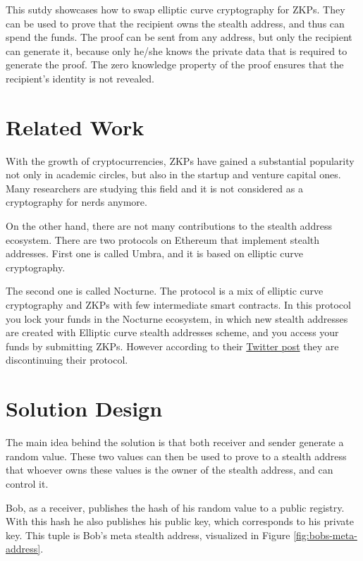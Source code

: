 \documentclass[conference,comsoc,10pt]{IEEEtran}
\begin{document}
        This sutdy showcases how to swap elliptic curve cryptography for ZKPs.
        They can be used to prove that the recipient owns the stealth address, and
        thus can spend the funds. The proof can be sent from any address, but only
        the recipient can generate it, because only he/she knows the private data
        that is required to generate the proof. The zero knowledge property of the
        proof ensures that the recipient's identity is not revealed.

    \section{Related Work}

        With the growth of cryptocurrencies, ZKPs have gained a substantial popularity
        not only in academic circles, but also in the startup and venture capital
        ones. Many researchers are studying this field and it is not considered 
        as a cryptography for nerds anymore.

        On the other hand, there are not many contributions to the stealth address
        ecosystem. There are two protocols on Ethereum that implement stealth addresses.
        First one is called Umbra\cite{umbra}, and it is based on elliptic curve
        cryptography.

        The second one is called Nocturne\cite{nocturne}. The protocol is a mix of
        elliptic curve cryptography and ZKPs with few intermediate smart contracts.
        In this protocol you lock your funds in the Nocturne ecosystem, in which
        new stealth addresses are created with Elliptic curve stealth addresses scheme,
        and you access your funds by submitting ZKPs. However according to their
        \href{https://twitter.com/nocturne_xyz/status/1749510390906511693}{Twitter post}
        they are discontinuing their protocol.


\section{Solution Design}

    The main idea behind the solution is that both
    receiver and sender generate a random value. These two values can then
    be used to prove to a stealth address that whoever owns these values
    is the owner of the stealth address, and can control it.

    Bob, as a receiver, publishes the hash of his random value to a public
    registry. With this hash he also publishes his public key, which corresponds
    to his private key. This tuple is Bob's meta stealth address, visualized in Figure
    \ref{fig:bobs-meta-address}.
\end{document}
